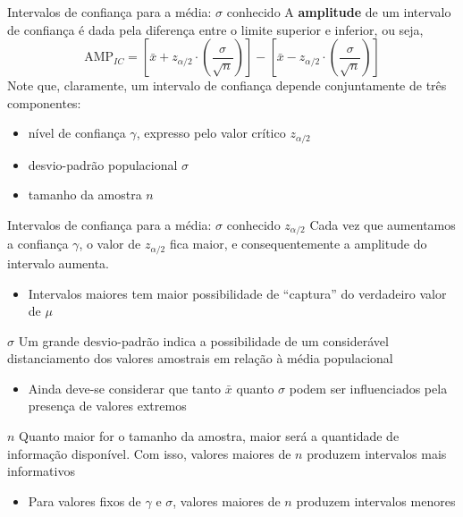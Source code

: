 \documentclass[10pt]{beamer}\usepackage[]{graphicx}\usepackage[]{color}
\theoremstyle{definition}
\begin{document}
\begin{frame}{Intervalos de confiança para a média: $\sigma$ conhecido}
  A \textbf{amplitude} de um intervalo de confiança é dada pela
  diferença entre o  limite superior e inferior, ou seja,
  \begin{equation*}
    \text{AMP}_{IC} =
    \left[ \bar{x} + z_{\alpha/2} \cdot
      \left( \frac{\sigma}{\sqrt{n}} \right) \right] -
    \left[ \bar{x} - z_{\alpha/2} \cdot
      \left( \frac{\sigma}{\sqrt{n}} \right) \right]
  \end{equation*}
  Note que, claramente, um intervalo de confiança depende conjuntamente
  de três componentes:
  \begin{itemize}
  \item nível de confiança $\gamma$, expresso pelo valor crítico
    $z_{\alpha/2}$
  \item desvio-padrão populacional $\sigma$
  \item tamanho da amostra $n$
  \end{itemize}
\end{frame}

\begin{frame}{Intervalos de confiança para a média: $\sigma$ conhecido}
  $z_{\alpha/2}$ Cada vez que aumentamos a confiança $\gamma$, o valor
  de $z_{\alpha/2}$ fica maior, e consequentemente a amplitude do
  intervalo aumenta.
  \begin{itemize}
  \item[] \small Intervalos maiores tem maior possibilidade de ``captura'' do
    verdadeiro valor de $\mu$
  \end{itemize}
  \vspace{1em}
  $\sigma$ Um grande desvio-padrão indica a possibilidade de um
  considerável distanciamento dos valores amostrais em relação à média
  populacional
  \begin{itemize}
  \item[] \small Ainda deve-se considerar que tanto $\bar{x}$ quanto
    $\sigma$ podem ser influenciados pela presença de valores extremos
  \end{itemize}
  \vspace{1em}
  $n$ Quanto maior for o tamanho da amostra, maior será a quantidade de
  informação disponível. Com isso, valores maiores de $n$ produzem
  intervalos mais informativos
  \begin{itemize}
  \item[] \small Para valores fixos de $\gamma$ e $\sigma$, valores
    maiores de $n$ produzem intervalos menores
  \end{itemize}
\end{frame}
\end{document}
